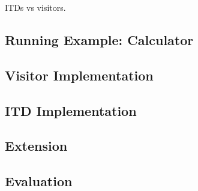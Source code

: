 ITDs vs visitors.

\subsection{Running Example: Calculator}

\subsection{Visitor Implementation}

\subsection{ITD Implementation}

\subsection{Extension}

\subsection{Evaluation}

